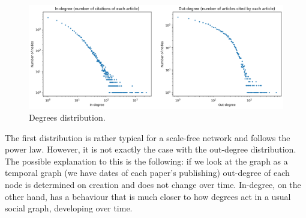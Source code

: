 \documentclass{article}
\begin{document}
\begin{figure}[h]
\centering
\includegraphics[width=1\linewidth]{degree_distribution.png}
\caption{Degrees distribution.}
\label{plot:degree}
\end{figure}

The first distribution is rather typical for a scale-free network and follows the power law. However, it is not exactly the case with the out-degree distribution. The possible explanation to this is the following: if we look at the graph as a temporal graph (we have dates of each paper's publishing) out-degree of each node is determined on creation and does not change over time. In-degree, on the other hand, has a behaviour that is much closer to how degrees act in a usual social graph, developing over time.
\end{document}
